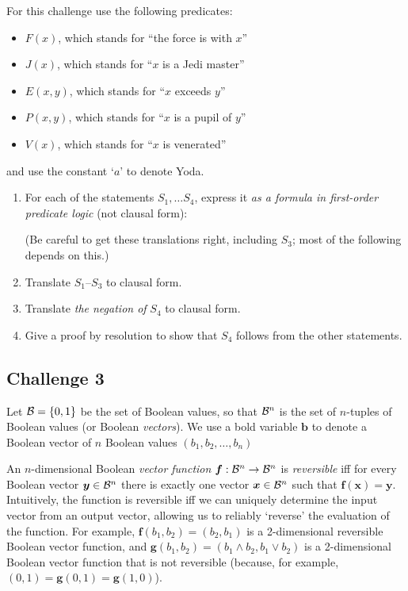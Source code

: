 \documentclass[12pt]{article}
\begin{document}
For this challenge use the following predicates:
\begin{itemize}
\setlength{\itemsep}{-0.5ex}
\item
$F(x)$, which stands for ``the force is with $x$''
\item
$J(x)$, which stands for ``$x$ is a Jedi master''
\item
$E(x,y)$, which stands for ``$x$ exceeds $y$''
\item
$P(x,y)$, which stands for ``$x$ is a pupil of $y$''
\item
$V(x)$, which stands for ``$x$ is venerated''
\end{itemize}
and use the constant `$a$' to denote Yoda.
\begin{enumerate}
\item
For each of the statements $S_1,\ldots S_4$, express it
\emph{as a formula in first-order predicate logic}
(not clausal form):
(Be careful to get these translations right, including $S_3$;
most of the following depends on this.)
\item
Translate $S_1$--$S_3$ to clausal form.
\item
Translate \emph{the negation of} $S_4$ to clausal form.
\item
Give a proof by resolution to show that $S_4$ follows from
the other statements.
\end{enumerate}

\subsection*{Challenge 3}

Let ${\cal B} = \{0,1\}$ be the set of Boolean values,
so that ${\cal B}^n$ is the set of $n$-tuples of Boolean values
(or Boolean \emph{vectors}).
We use a bold variable $\bm{b}$ to denote a Boolean vector
of $n$ Boolean values $(b_1, b_2, \ldots, b_n)$

An $n$-dimensional Boolean \emph{vector function}
$\bm{f} : {\cal B}^n \rightarrow {\cal B}^n$
is \emph{reversible} iff
for every Boolean vector $\bm{y} \in {\cal B}^n$
there is exactly one vector $\bm{x} \in {\cal B}^n$
such that $\bm{f}(\bm{x}) = \bm{y}$.
Intuitively, the function is reversible iff we can uniquely
determine the input vector from an output vector, allowing us
to reliably `reverse' the evaluation of the function.
For example, $\bm{f}(b_1, b_2) = (b_2, b_1)$ is a
2-dimensional reversible Boolean vector function, and
$\bm{g}(b_1, b_2) = (b_1 \land b_2, b_1 \lor b_2)$ is a
2-dimensional Boolean vector function that is not reversible
(because, for example, $(0, 1) = \bm{g}(0, 1) = \bm{g}(1, 0)$).
\end{document}
